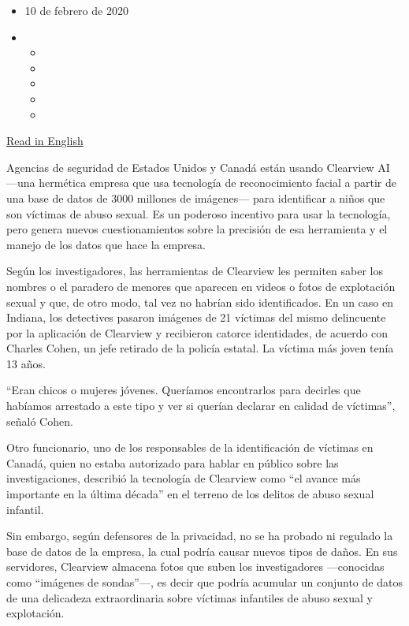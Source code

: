 \begin{itemize}
\item
  10 de febrero de 2020
\item
  \begin{itemize}
  \item
  \item
  \item
  \item
  \item
  \end{itemize}
\end{itemize}

\href{https://www.nytimes.com/2020/02/07/business/clearview-facial-recognition-child-sexual-abuse.html}{Read
in English}

Agencias de seguridad de Estados Unidos y Canadá están usando Clearview
AI ---una hermética empresa que usa tecnología de reconocimiento facial
a partir de una base de datos de 3000 millones de imágenes--- para
identificar a niños que son víctimas de abuso sexual. Es un poderoso
incentivo para usar la tecnología, pero genera nuevos cuestionamientos
sobre la precisión de esa herramienta y el manejo de los datos que hace
la empresa.

Según los investigadores, las herramientas de Clearview les permiten
saber los nombres o el paradero de menores que aparecen en videos o
fotos de explotación sexual y que, de otro modo, tal vez no habrían sido
identificados. En un caso en Indiana, los detectives pasaron imágenes de
21 víctimas del mismo delincuente por la aplicación de Clearview y
recibieron catorce identidades, de acuerdo con Charles Cohen, un jefe
retirado de la policía estatal. La víctima más joven tenía 13 años.

``Eran chicos o mujeres jóvenes. Queríamos encontrarlos para decirles
que habíamos arrestado a este tipo y ver si querían declarar en calidad
de víctimas'', señaló Cohen.

Otro funcionario, uno de los responsables de la identificación de
víctimas en Canadá, quien no estaba autorizado para hablar en público
sobre las investigaciones, describió la tecnología de Clearview como
``el avance más importante en la última década'' en el terreno de los
delitos de abuso sexual infantil.

Sin embargo, según defensores de la privacidad, no se ha probado ni
regulado la base de datos de la empresa, la cual podría causar nuevos
tipos de daños. En sus servidores, Clearview almacena fotos que suben
los investigadores ---conocidas como ``imágenes de sondas''---, es decir
que podría acumular un conjunto de datos de una delicadeza
extraordinaria sobre víctimas infantiles de abuso sexual y explotación.

